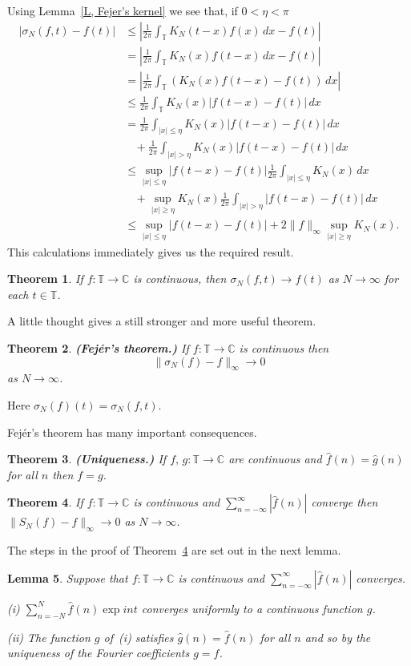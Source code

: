 \documentclass[12pt]{article}
\newtheorem{theorem}{Theorem}[section]
\newtheorem{lemma}[theorem]{Lemma}
\theoremstyle{definition}
\begin{document}
Using Lemma~\ref{L, Fejer's kernel} we see that, if $0<\eta<\pi$
\begin{align*}
|\sigma_{N}(f,t)-f(t)|&\leq
\left|\frac{1}{2\pi}\int_{\mathbb T}K_{N}(t-x)f(x)\,dx-f(t)\right|\\
&=\left|\frac{1}{2\pi}\int_{\mathbb T}K_{N}(x)f(t-x)\,dx-f(t)\right|\\
&=\left|\frac{1}{2\pi}\int_{\mathbb T}(K_{N}(x)f(t-x)-f(t))\,dx\right|\\
&\leq\frac{1}{2\pi}\int_{\mathbb T}K_{N}(x)|f(t-x)-f(t)|\,dx\\
&=\frac{1}{2\pi}\int_{|x|\leq\eta}K_{N}(x)|f(t-x)-f(t)|\,dx\\
&\ \ \ 
\ +\frac{1}{2\pi}\int_{|x|>\eta}K_{N}(x)|f(t-x)-f(t)|\,dx\\
&\leq\sup_{|x|\leq\eta}|f(t-x)-f(t)|
\frac{1}{2\pi}\int_{|x|\leq\eta}K_{N}(x)\,dx\\
&\ \ \
\ +\sup_{|x|\geq\eta}K_{N}(x)\frac{1}{2\pi}
\int_{|x|>\eta}|f(t-x)-f(t)|\,dx\\
&\leq\sup_{|x|\leq\eta}|f(t-x)-f(t)|+
2\|f\|_{\infty}\sup_{|x|\geq\eta}K_{N}(x).
\end{align*}
This calculations immediately gives us the required result.
\begin{theorem} If $f:{\mathbb T}\rightarrow{\mathbb C}$ 
is continuous, then
$\sigma_{N}(f,t)\rightarrow f(t)$ as $N\rightarrow\infty$
for each $t\in{\mathbb T}$.
\end{theorem}
A little thought gives a still stronger and more useful
theorem.
\begin{theorem} {\bf (Fej\'{e}r's theorem.)}
If $f:{\mathbb T}\rightarrow{\mathbb C}$ 
is continuous then
\[\|\sigma_{N}(f)-f\|_{\infty}\rightarrow 0\]
as $N\rightarrow\infty$.
\end{theorem}
Here $\sigma_{N}(f)(t)=\sigma_{N}(f,t)$.

Fej\'{e}r's theorem has many important consequences.
\begin{theorem} {\bf (Uniqueness.)}
If $f,\,g:{\mathbb T}\rightarrow{\mathbb C}$ 
are continuous and $\hat{f}(n)=\hat{g}(n)$ for
all $n$ then $f=g$.
\end{theorem}
\begin{theorem}\label{T, absolutely convergent}
If $f:{\mathbb T}\rightarrow{\mathbb C}$ 
is continuous and 
$\sum_{n=-\infty}^{\infty}|\hat{f}(n)|$ converge then
$\|S_{N}(f)-f\|_{\infty}\rightarrow 0$ as $N\rightarrow\infty$.
\end{theorem}
The steps in the proof of Theorem~\ref{T, absolutely convergent}
are set out in the next lemma.
\begin{lemma} Suppose that
$f:{\mathbb T}\rightarrow{\mathbb C}$ 
is continuous and 
$\sum_{n=-\infty}^{\infty}|\hat{f}(n)|$ converges.

(i) $\sum_{n=-N}^{N}\hat{f}(n)\exp int$
converges uniformly to a continuous function $g$.

(ii) The function $g$ of~(i) satisfies $\hat{g}(n)=\hat{f}(n)$
for all $n$ and so by the uniqueness of the Fourier coefficients
$g=f$.
\end{lemma}
\end{document}
